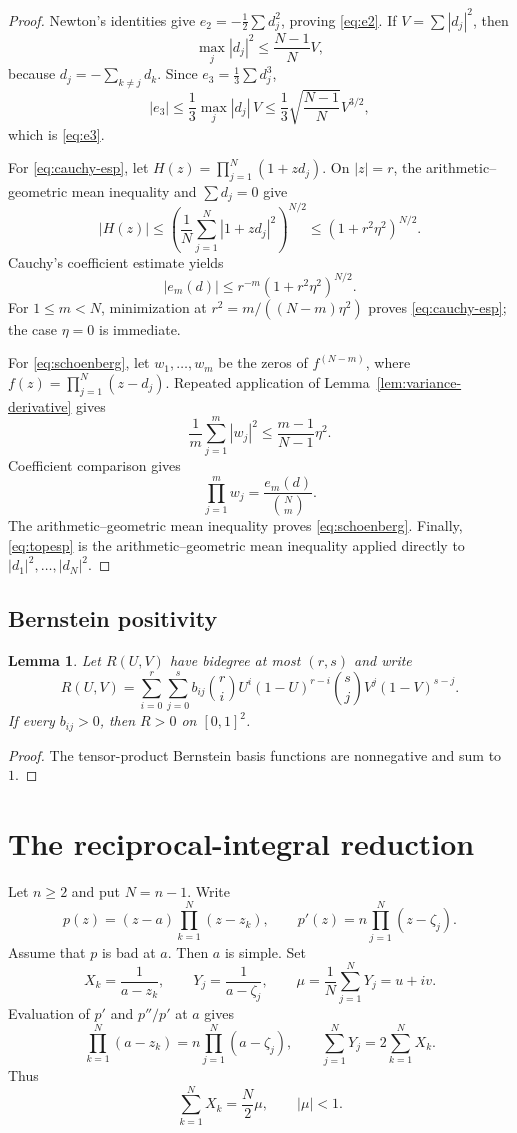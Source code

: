 \documentclass[11pt]{article}
\newtheorem{lemma}[theorem]{Lemma}
\theoremstyle{remark}
\begin{document}
\begin{proof}
Newton's identities give $e_2=-\frac12\sum d_j^2$, proving
\eqref{eq:e2}.  If $V=\sum|d_j|^2$, then
\[
 \max_j|d_j|^2\le\frac{N-1}{N}V,
\]
because $d_j=-\sum_{k\ne j}d_k$.  Since
$e_3=\frac13\sum d_j^3$,
\[
 |e_3|\le\frac13\max_j|d_j|\,V
 \le\frac13\sqrt{\frac{N-1}{N}}V^{3/2},
\]
which is \eqref{eq:e3}.

For \eqref{eq:cauchy-esp}, let
$H(z)=\prod_{j=1}^N(1+zd_j)$.  On $|z|=r$, the arithmetic--geometric mean
inequality and $\sum d_j=0$ give
\[
 |H(z)|
 \le\left(\frac1N\sum_{j=1}^N|1+zd_j|^2\right)^{N/2}
 \le(1+r^2\eta^2)^{N/2}.
\]
Cauchy's coefficient estimate yields
\[
 |e_m(d)|\le r^{-m}(1+r^2\eta^2)^{N/2}.
\]
For $1\le m<N$, minimization at
$r^2=m/((N-m)\eta^2)$ proves \eqref{eq:cauchy-esp}; the case $\eta=0$ is
immediate.

For \eqref{eq:schoenberg}, let $w_1,\ldots,w_m$ be the zeros of
$f^{(N-m)}$, where $f(z)=\prod_{j=1}^N(z-d_j)$.  Repeated application of
Lemma~\ref{lem:variance-derivative} gives
\[
 \frac1m\sum_{j=1}^m|w_j|^2
 \le\frac{m-1}{N-1}\eta^2.
\]
Coefficient comparison gives
\[
 \prod_{j=1}^m w_j=\frac{e_m(d)}{\binom Nm}.
\]
The arithmetic--geometric mean inequality proves \eqref{eq:schoenberg}.
Finally, \eqref{eq:topesp} is the arithmetic--geometric mean inequality
applied directly to $|d_1|^2,\ldots,|d_N|^2$.
\end{proof}

\subsection{Bernstein positivity}

\begin{lemma}\label{lem:bernstein}
Let $R(U,V)$ have bidegree at most $(r,s)$ and write
\[
 R(U,V)=\sum_{i=0}^r\sum_{j=0}^s b_{ij}
 \binom riU^i(1-U)^{r-i}
 \binom sjV^j(1-V)^{s-j}.
\]
If every $b_{ij}>0$, then $R>0$ on $[0,1]^2$.
\end{lemma}

\begin{proof}
The tensor-product Bernstein basis functions are nonnegative and sum to $1$.
\end{proof}

\section{The reciprocal-integral reduction}

Let $n\ge2$ and put $N=n-1$.  Write
\[
 p(z)=(z-a)\prod_{k=1}^N(z-z_k),
 \qquad
 p'(z)=n\prod_{j=1}^N(z-\zeta_j).
\]
Assume that $p$ is bad at $a$.  Then $a$ is simple.  Set
\[
 X_k=\frac1{a-z_k},\qquad
 Y_j=\frac1{a-\zeta_j},\qquad
 \mu=\frac1N\sum_{j=1}^NY_j=u+iv.
\]
Evaluation of $p'$ and $p''/p'$ at $a$ gives
\begin{equation}\label{eq:anchors-general}
 \prod_{k=1}^N(a-z_k)=n\prod_{j=1}^N(a-\zeta_j),
 \qquad
 \sum_{j=1}^NY_j=2\sum_{k=1}^NX_k.
\end{equation}
Thus
\begin{equation}\label{eq:mu-general}
 \sum_{k=1}^NX_k=\frac N2\mu,
 \qquad
 |\mu|<1.
\end{equation}
\end{document}
